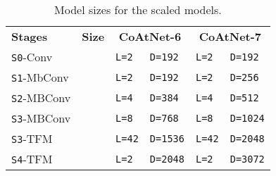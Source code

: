 \documentclass{article}
\newcommand{\name}{CoAtNet\xspace}
\begin{document}
\begin{table}[!ht]
    \centering
    \caption{Model sizes for the scaled models.}
    \begin{tabular}{l c ll ll}
    \toprule
    \bf Stages & \bf Size 
    & \multicolumn{2}{c}{\bf \name-6} & \multicolumn{2}{c}{\bf \name-7} \\
\cmidrule(r){1-2} \cmidrule(lr){3-4} \cmidrule(l){5-6}
    \texttt{S0}-Conv &               
        & \texttt{L=2} & \texttt{D=192} 
        & \texttt{L=2} & \texttt{D=192} \\
    \cmidrule(r){1-2} \cmidrule(lr){3-4} \cmidrule(l){5-6}
    \texttt{S1}-MbConv &               
        & \texttt{L=2} & \texttt{D=192} 
        & \texttt{L=2} & \texttt{D=256} \\
    \cmidrule(r){1-2} \cmidrule(lr){3-4} \cmidrule(l){5-6}
    \texttt{S2}-MBConv &             
        & \texttt{L=4} & \texttt{D=384} 
        & \texttt{L=4} & \texttt{D=512} \\
    \cmidrule(r){1-2} \cmidrule(lr){3-4} \cmidrule(l){5-6}
    \texttt{S3}-MBConv & \multirow{2}{*}{}
        & \texttt{L=8}  & \texttt{D=768} 
        & \texttt{L=8}  & \texttt{D=1024} \\
    \texttt{S3}-TFM & 
        & \texttt{L=42}  & \texttt{D=1536} 
        & \texttt{L=42}  & \texttt{D=2048} \\
    \cmidrule(r){1-2} \cmidrule(lr){3-4} \cmidrule(l){5-6}
    \texttt{S4}-TFM &  
        & \texttt{L=2} & \texttt{D=2048} 
        & \texttt{L=2}  & \texttt{D=3072} \\
    \bottomrule
    \end{tabular}
    \label{tab:scaled_jft_model}
\end{table}
\end{document}
